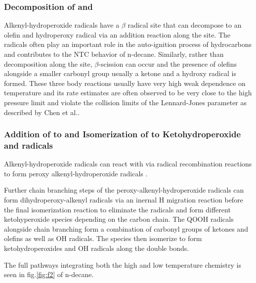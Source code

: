 \subsubsection{Decomposition of  and }

Alkenyl-hydroperoxide radicals  have a $\beta$ radical site that can decompose to an olefin and hydroperoxy radical  via an addition reaction along the  site. The  radicals often play an important role in the auto-ignition process of hydrocarbons and contributes to the NTC behavior of n-decane. Similarly, rather than decomposition along the  site, $\beta$-scission can occur and the presence of olefins alongside a smaller carbonyl group usually a ketone and a hydroxy radical  is formed. These three body reactions usually have very high weak dependence on temperature and its rate estimates are often observed to be very close to the high pressure limit and violate the collision limits of the Lennard-Jones parameter as described by Chen et al.\cite{Chen2017ViolationModels}. 


\subsubsection{Addition of  to  and Isomerization of  to Ketohydroperoxide and  radicals}
Alkenyl-hydroperoxide  radicals can react with  via radical recombination reactions to form peroxy alkenyl-hydroperoxide radicals . 
 
 Further chain branching steps of the peroxy-alkenyl-hydroperoxide radicals can form  dihydroperoxy-alkenyl radicals via an inernal H migration reaction before the final isomerization reaction to eliminate the  radicals and form different ketohyperoxide species depending on the carbon chain. The QOOH radicals alongside chain branching form a combination of carbonyl groups of ketones and olefins as well as OH radicals. The  species then isomerize to form ketohydroperoxides and OH radicals along the double bonds.  
 
 The full pathways integrating both the high and low temperature chemistry is seen in fig.\ref{fig:f2} of n-decane.

